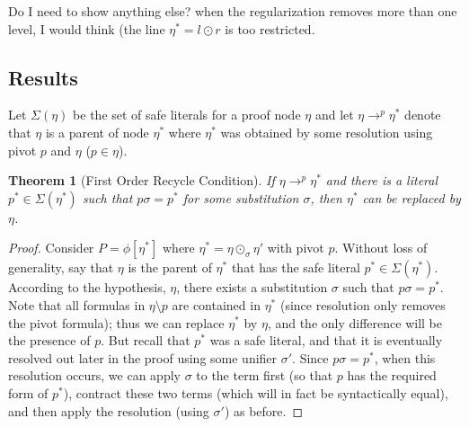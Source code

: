 \documentclass[12pt]{article}
\newtheorem{thm}{Theorem}[section]
\theoremstyle{definition}
\theoremstyle{remark}
\newcommand{\safeliterals}[1]{ \Sigma({#1}) }
\begin{document}
Do I need to show anything else? when the regularization removes more than one level, I would think (the line $\eta^* = l \odot r$ is too restricted.
\newpage
\subsection{Results}
Let $\safeliterals{\eta}$ be the set of safe literals for a proof node $\eta$ and let $\eta \rightarrow^{p} \eta^*$ denote that $\eta$ is a parent of node $\eta^*$ where $\eta^*$ was obtained by some resolution using pivot $p$ and $\eta$ ($p \in \eta$).

\begin{thm}[First Order Recycle Condition]\label{recycle-cond}
If $\eta \rightarrow^{p} \eta^*$ and there is a literal $p^* \in \safeliterals{\eta^*}$ such that $p \sigma = p^*$ for some substitution $\sigma$, then $\eta^*$ can be replaced by $\eta$.
\end{thm}

\begin{proof}[Proof]
Consider $P=\phi[\eta^*]$ where $\eta^* = \eta \odot_\sigma \eta'$ with pivot $p$. Without loss of generality, say that $\eta$ is the parent of $\eta^*$ that has the safe literal $p^* \in \safeliterals{\eta^*}$. According to the hypothesis, $\eta$, there exists a substitution $\sigma$ such that $p\sigma=p^*$. Note that all formulas in $\eta \setminus p$ are contained in $\eta^*$ (since resolution only removes the pivot formula); thus we can replace $\eta^*$ by $\eta$, and the only difference will be the presence of $p$. But recall that $p^*$ was a safe literal, and that it is eventually resolved out later in the proof using some unifier $\sigma'$. Since $p\sigma = p^*$, when this resolution occurs, we can apply $\sigma$ to the term first (so that $p$ has the required form of $p^*$), contract these two terms (which will in fact be syntactically equal), and then apply the resolution (using $\sigma'$) as before.
\end{proof}
\end{document}
